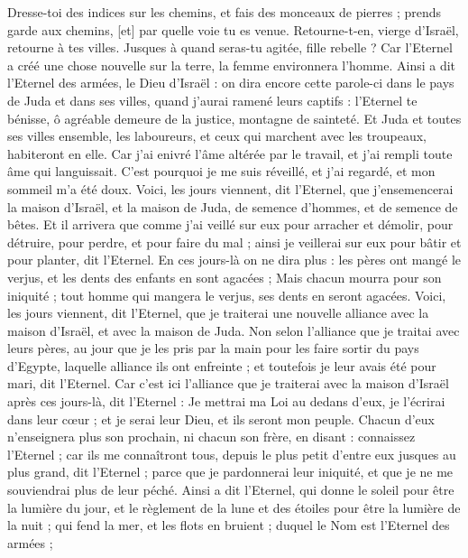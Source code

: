 \begin{multicols}{2}
Dresse-toi des indices sur les chemins, et fais des monceaux de pierres ; prends garde aux chemins, [et] par quelle voie tu es venue. Retourne-t-en, vierge d'Israël, retourne à tes villes.
Jusques à quand seras-tu agitée, fille rebelle ? Car l'Eternel a créé une chose nouvelle sur la terre, la femme environnera l'homme.
Ainsi a dit l'Eternel des armées, le Dieu d'Israël : on dira encore cette parole-ci dans le pays de Juda et dans ses villes, quand j'aurai ramené leurs captifs : l'Eternel te bénisse, ô agréable demeure de la justice, montagne de sainteté.
Et Juda et toutes ses villes ensemble, les laboureurs, et ceux qui marchent avec les troupeaux, habiteront en elle.
Car j'ai enivré l'âme altérée par le travail, et j'ai rempli toute âme qui languissait.
C'est pourquoi je me suis réveillé, et j'ai regardé, et mon sommeil m'a été doux.
Voici, les jours viennent, dit l'Eternel, que j'ensemencerai la maison d'Israël, et la maison de Juda, de semence d'hommes, et de semence de bêtes.
Et il arrivera que comme j'ai veillé sur eux pour arracher et démolir, pour détruire, pour perdre, et pour faire du mal ; ainsi je veillerai sur eux pour bâtir et pour planter, dit l'Eternel.
En ces jours-là on ne dira plus : les pères ont mangé le verjus, et les dents des enfants en sont agacées ;
Mais chacun mourra pour son iniquité ; tout homme qui mangera le verjus, ses dents en seront agacées.
Voici, les jours viennent, dit l'Eternel, que je traiterai une nouvelle alliance avec la maison d'Israël, et avec la maison de Juda.
Non selon l'alliance que je traitai avec leurs pères, au jour que je les pris par la main pour les faire sortir du pays d'Egypte, laquelle alliance ils ont enfreinte ; et toutefois je leur avais été pour mari, dit l'Eternel.
Car c'est ici l'alliance que je traiterai avec la maison d'Israël après ces jours-là, dit l'Eternel : Je mettrai ma Loi au dedans d'eux, je l'écrirai dans leur cœur ; et je serai leur Dieu, et ils seront mon peuple.
Chacun d'eux n'enseignera plus son prochain, ni chacun son frère, en disant : connaissez l'Eternel ; car ils me connaîtront tous, depuis le plus petit d'entre eux jusques au plus grand, dit l'Eternel ; parce que je pardonnerai leur iniquité, et que je ne me souviendrai plus de leur péché.
Ainsi a dit l'Eternel, qui donne le soleil pour être la lumière du jour, et le règlement de la lune et des étoiles pour être la lumière de la nuit ; qui fend la mer, et les flots en bruient ; duquel le Nom est l'Eternel des armées ;

\end{multicols}
